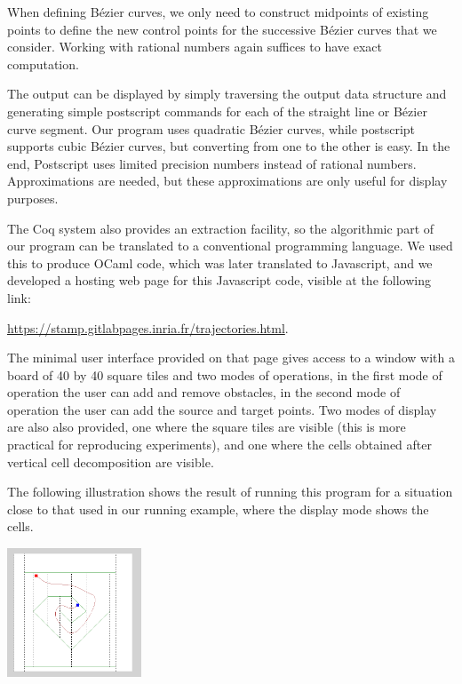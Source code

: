 \documentclass{llncs}
\begin{document}
When defining Bézier curves, we only need to construct midpoints of
existing points to define the new control points for the successive
Bézier curves that we consider.  Working with rational numbers
again suffices to have exact computation.

The output can be displayed by simply traversing the
output data structure and generating simple postscript commands for
each of the straight line or Bézier curve segment.  Our program uses
quadratic Bézier curves, while postscript supports cubic Bézier
curves, but converting from one to the other is easy.  In the end,
Postscript uses limited precision numbers instead of rational numbers.
Approximations are
needed, but these approximations are only useful for display purposes.

The Coq system also provides an extraction facility, so the
algorithmic part of our program can be translated to a conventional
programming language.  We used this to produce OCaml code, which was
later translated to Javascript, and we developed a hosting web page for
this Javascript code, visible at the following link:
\begin{center}
\url{https://stamp.gitlabpages.inria.fr/trajectories.html}.
\end{center}

The minimal user interface provided on that page gives access to a 
window with a board of 40 by 40 square tiles and two modes of operations, in
the first mode of operation the user can add and remove obstacles, in the
second mode of operation the user can add the source and target points.  Two
modes of display are also also provided, one where the square tiles are
visible (this is more practical for reproducing experiments), and one where
the cells obtained after vertical cell decomposition are visible.

The following illustration shows the result of running this program for
a situation close to that used in our running example, where the display mode
shows the cells.
\begin{center}
\includegraphics[width=0.3\textwidth]{illustration.png}
\end{center}
\end{document}
